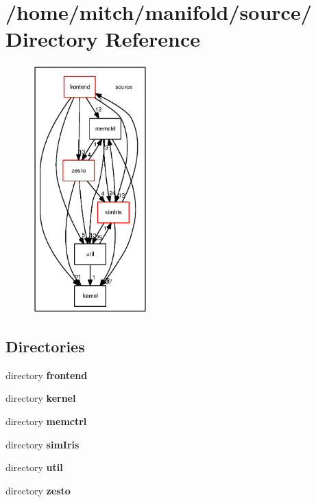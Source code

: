 \section{/home/mitch/manifold/source/ Directory Reference}
\label{dir_014faa727c0b2aaba2cbdd8f326de4f6}


\nopagebreak
\begin{figure}[H]
\begin{center}
\leavevmode
\includegraphics[width=125pt]{dir_014faa727c0b2aaba2cbdd8f326de4f6_dep}
\end{center}
\end{figure}
\subsection*{Directories}
\begin{CompactItemize}
\item 
directory {\bf frontend}
\item 
directory {\bf kernel}
\item 
directory {\bf memctrl}
\item 
directory {\bf simIris}
\item 
directory {\bf util}
\item 
directory {\bf zesto}
\end{CompactItemize}
